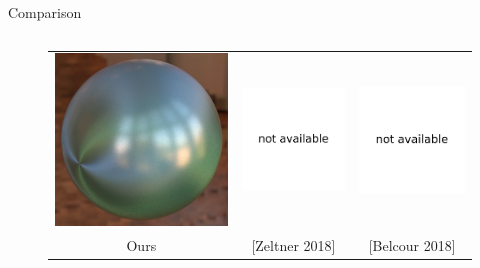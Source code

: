\documentclass[final]{beamer}
\newlength{\onecolwid}
\newlength{\twocolwid}
\begin{document}
\begin{frame}[t]
\begin{columns}[t]
\begin{column}{\twocolwid}
\begin{block}{Comparison}
\begin{columns}[t,totalwidth=\twocolwid]
\begin{column}{\onecolwid}
\begin{figure}
\begin{tabular}{ccc}
                    	    \includegraphics[width=0.32\columnwidth]{images/validations/compare2/sphere_1024spp_60min.jpg} &
                    	    \includegraphics[width=0.32\columnwidth]{images/validations/compare2/na.pdf} &
                    	    \includegraphics[width=0.32\columnwidth]{images/validations/compare2/na.pdf} \\
                    
                    	    \small{Ours} &
                    	    \small{[Zeltner 2018]} &
                    	    \small{[Belcour 2018]}
                    	\end{tabular}
                    \end{figure}
                \end{column}
            

\end{columns}
\end{block}
\end{column}
\end{columns}
\end{frame}
\end{document}
